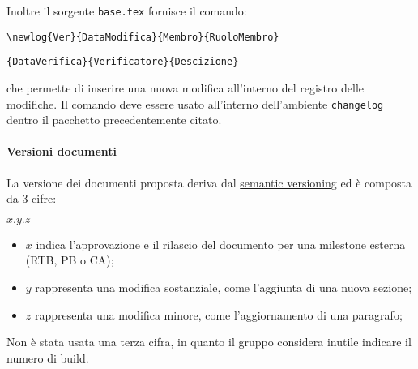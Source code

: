             Inoltre il sorgente \verb|base.tex| fornisce il comando:
            \begin{center}
                \verb*|\newlog{Ver}{DataModifica}{Membro}{RuoloMembro}|\par\verb|{DataVerifica}{Verificatore}{Descizione}|
            \end{center}
            che permette di inserire una nuova modifica all'interno del registro delle modifiche. Il comando deve essere usato all'interno dell'ambiente \verb|changelog| dentro il pacchetto precedentemente citato.

        \paragraph{Versioni documenti} \label{sec:doc_version}
            La versione dei documenti proposta deriva dal \href{https://semver.org/}{semantic versioning} ed è composta da 3 cifre:
            \begin{center}
                $x.y.z$
            \end{center}
            \begin{itemize}
            	\item $x$ indica l'approvazione e il rilascio del documento per una milestone esterna (RTB, PB o CA);
                \item $y$ rappresenta una modifica sostanziale, come l'aggiunta di una nuova sezione;
                \item $z$ rappresenta una modifica minore, come l'aggiornamento di una paragrafo;
            \end{itemize}
            Non è stata usata una terza cifra, in quanto il gruppo considera inutile indicare il numero di build.

